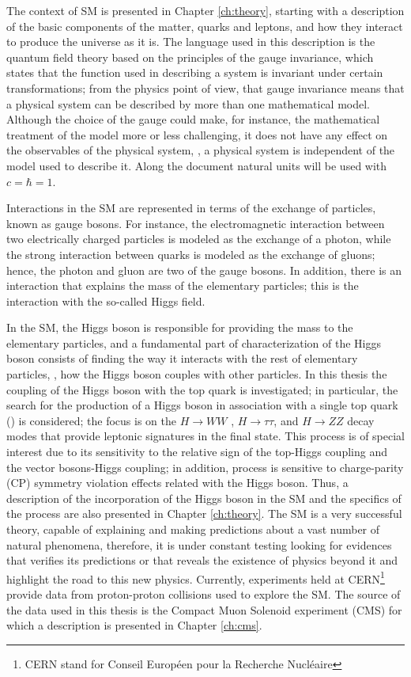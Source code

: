 The context of SM is presented in Chapter \ref{ch:theory}, starting with a description of the basic components of the matter, quarks and leptons, and how they interact to produce the universe as it is. The language used in this description is the quantum field theory based on the principles of the gauge invariance, which states that the function used in describing a system is invariant under certain transformations; from the physics point of view, that gauge invariance means that a physical system can be described by more than one mathematical model. Although the choice of the gauge could make, for instance, the mathematical treatment of the model more or less challenging, it does not have any effect on the observables of the physical system, \ie, a physical system is independent of the model used to describe it. Along the document natural units will be used with $c=\hbar=1$. 

Interactions in the SM are represented in terms of the exchange of particles, known as gauge bosons. For instance, the electromagnetic interaction between two electrically charged particles is modeled as the exchange of a photon, while the strong interaction between quarks is modeled as the exchange of gluons; hence, the photon and gluon are two of the gauge bosons. In addition, there is an interaction that explains the mass of the elementary particles; this is the interaction with the so-called Higgs field.    

In the SM, the Higgs boson is responsible for providing the mass to the elementary particles, and a fundamental part of characterization of the Higgs boson consists of finding the way it interacts with the rest of elementary particles, \ie, how the Higgs boson couples with other particles. In this thesis the coupling of the Higgs boson with the top quark is investigated; in particular, the search for the production of a Higgs boson in association with a single top quark (\tH) is considered; the focus is on the $H \to WW$ , $H \to \tau\tau$, and $H \to ZZ$ decay modes that provide leptonic signatures in the final state. This process is of special interest due to its sensitivity to the relative sign of the top-Higgs coupling and the vector bosons-Higgs coupling; in addition, \tH process is sensitive to charge-parity (CP) symmetry violation effects related with the Higgs boson. Thus, a description of the incorporation of the Higgs boson in the SM and the specifics of the \tH process are also presented in Chapter \ref{ch:theory}.               
The SM is a very successful theory, capable of explaining and making predictions about a vast number of natural phenomena, therefore, it is under constant testing looking for evidences that verifies its predictions or that reveals the existence of physics beyond it and highlight the road to this new physics. Currently, experiments held at CERN\footnote{CERN stand for Conseil Europ\'een pour la Recherche Nucl\'eaire} provide data from proton-proton collisions used to explore the SM. The source of the data used in this thesis is the Compact Muon Solenoid experiment (CMS) for which a description is presented in Chapter \ref{ch:cms}.

